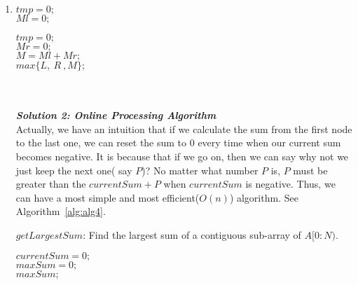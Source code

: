 \documentclass[12pt,a4paper]{article}
\makeatletter
\newtheorem*{solution}{Solution}
\renewenvironment{solution}[1][Solution] {\par\pushQED{\qed}\normalfont\topsep6\p@\@plus6\p@\relax\trivlist\item[\hskip\labelsep\bfseries#1\@addpunct{.}]\ignorespaces}{\popQED\endtrivlist\@endpefalse} \makeatother
\makeatother
\begin{document}
\begin{enumerate}
\begin{solution}
\begin{algorithm}
  $tmp = 0;$\\
  $Ml = 0;$\\

  $tmp = 0;$\\
  $Mr = 0;$\\
  $M = Ml + Mr;$\\
  
  \Return $max\{L,~R~,M\};$
\end{algorithm}
~\\
~\\


\emph{\bf{Solution 2: Online Processing Algorithm }}\\
Actually, we have an intuition that if we calculate the sum from the first node to the last one, we can reset the sum to 0 every time when our current sum becomes negative. It is because that if we go on, then we can say why not we just keep the next one( say $P$)? No matter what number $P$ is, $P$ must be greater than the $currentSum+P$ when $currentSum$ is negative. Thus, we can have a most simple and most efficient($O(n)$) algorithm. See Algorithm~\ref{alg:alg4}.

\begin{algorithm} 
  \label{alg:alg4}
  \caption{$getLargestSum$: Find the largest sum of a contiguous sub-array of $A[0:N)$.} 

  $currentSum = 0;$\\
  $maxSum= 0;$\\
  \For{$i \in [~0,N~) $ }{
  	$currentSum += A[i];$\\
  	$maxSum = max\{maxSum,~currentSum\}$;\\
  	\If{$currentSum<0$}{
  		$currentSum = 0;$\\
  	}
  }
  \Return $maxSum;$
\end{algorithm}


\end{solution}
\end{enumerate}
\end{document}
